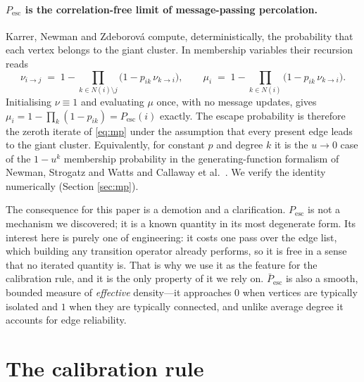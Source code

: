 \documentclass[11pt,a4paper]{article}
\newcommand{\Pesc}{P_{\mathrm{esc}}}
\newcommand{\Pescbar}{\bar{P}_{\mathrm{esc}}}
\begin{document}
\paragraph{$\Pesc$ is the correlation-free limit of message-passing percolation.}
Karrer, Newman and Zdeborov\'a \cite{knz14} compute, deterministically, the
probability that each vertex belongs to the giant cluster. In membership
variables their recursion reads
\begin{equation}
\nu_{i\to j} \;=\; 1-\!\!\prod_{k\in N(i)\setminus j}\!\!\big(1-p_{ik}\,\nu_{k\to i}\big),
\qquad
\mu_i \;=\; 1-\!\prod_{k\in N(i)}\!\big(1-p_{ik}\,\nu_{k\to i}\big).
\label{eq:mp}
\end{equation}
Initialising $\nu\equiv1$ and evaluating $\mu$ once, with no message updates,
gives $\mu_i=1-\prod_k(1-p_{ik})=\Pesc(i)$ exactly. The escape probability is
therefore the zeroth iterate of \eqref{eq:mp} under the assumption that every
present edge leads to the giant cluster. Equivalently, for constant $p$ and
degree $k$ it is the $u\to0$ case of the $1-u^k$ membership probability in the
generating-function formalism of Newman, Strogatz and Watts \cite{nsw01} and
Callaway et al.\ \cite{callaway00}. We verify the identity numerically
(Section \ref{sec:mp}).

The consequence for this paper is a demotion and a clarification. $\Pesc$ is
not a mechanism we discovered; it is a known quantity in its most degenerate
form. Its interest here is purely one of engineering: it costs one pass over
the edge list, which building any transition operator already performs, so it is
free in a sense that no iterated quantity is. That is why we use it as the
feature for the calibration rule, and it is the only property of it we rely on.
$\Pescbar$ is also a smooth, bounded measure of \emph{effective} density---it
approaches $0$ when vertices are typically isolated and $1$ when they are
typically connected, and unlike average degree it accounts for edge reliability.

\section{The calibration rule}
\label{sec:rule}
\end{document}
